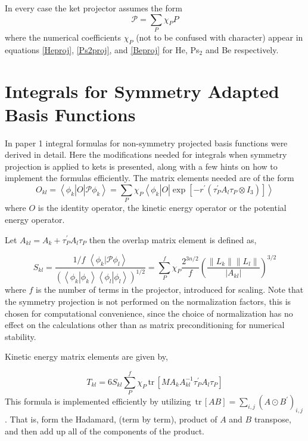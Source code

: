 \documentclass[12pt,thmsa,suthesis,verbatim]{report}
\begin{document}
In every case the ket projector assumes the form 
\begin{equation}
\mathcal{P=}\sum_P\chi _PP
\end{equation}
where the numerical coefficients $\chi _P$ (not to be confused with
character) appear in equations \ref{Heproj}, \ref{Ps2proj}, and \ref{Beproj}
for He, Ps$_2$ and Be respectively.

\section{Integrals for Symmetry Adapted Basis Functions}

In paper 1 integral formulas for non-symmetry projected basis functions were
derived in detail. Here the modifications needed for integrals when symmetry
projection is applied to kets is presented, along with a few hints on how to
implement the formulas efficiently. The matrix elements needed are of the
form 
\[
O_{kl}=\left\langle \phi _k\right| O\left| \mathcal{P}\phi _k\right\rangle
=\sum_P\chi _P\left\langle \phi _k\right| O\left| \exp \left[ -r^{\prime
}\left( \tau _P^{\prime }A_l\tau _P\otimes I_3\right) \right] \right\rangle 
\]
where $O$ is the identity operator, the kinetic energy operator or the
potential energy operator.

Let $A_{kl}=A_k+\tau _P^{\prime }A_l\tau _P$ then the overlap matrix element
is defined as,

\begin{equation}
S_{kl}=\frac{1/f\,\,\left\langle \phi _k\right. |\left. \mathcal{P}\phi
_l\right\rangle }{\left( \left\langle \phi _k\right. |\left. \phi
_k\right\rangle \left\langle \phi _l\right. |\left. \phi _l\right\rangle
\right) ^{1/2}}=\sum_P^f\chi _P\frac{2^{3n/2}}f\left( \frac{\left\|
L_k\right\| \left\| L_l\right\| }{\left| A_{kl}\right| }\right) ^{3/2}
\label{skl}
\end{equation}
where $f$ is the number of terms in the projector, introduced for scaling.
Note that the symmetry projection is not performed on the normalization
factors, this is chosen for computational convenience, since the choice of
normalization has no effect on the calculations other than as matrix
preconditioning for numerical stability.

Kinetic energy matrix elements are given by,

\begin{equation}
T_{kl}=6S_{kl}\sum_P^f\chi _P\,\mathrm{tr}\,\left[ MA_kA_{kl}^{-1}\tau
_P^{\prime }A_l\tau _P\right]  \label{Tkl}
\end{equation}
This formula is implemented efficiently by utilizing $\,\mathrm{tr}\,\left[
AB\right] =\sum_{i,j}\left( A\odot B^{\prime }\right) _{i,j}$. That is, form
the Hadamard, (term by term), product of $A$ and $B$ transpose, and then add
up all of the components of the product.
\end{document}
